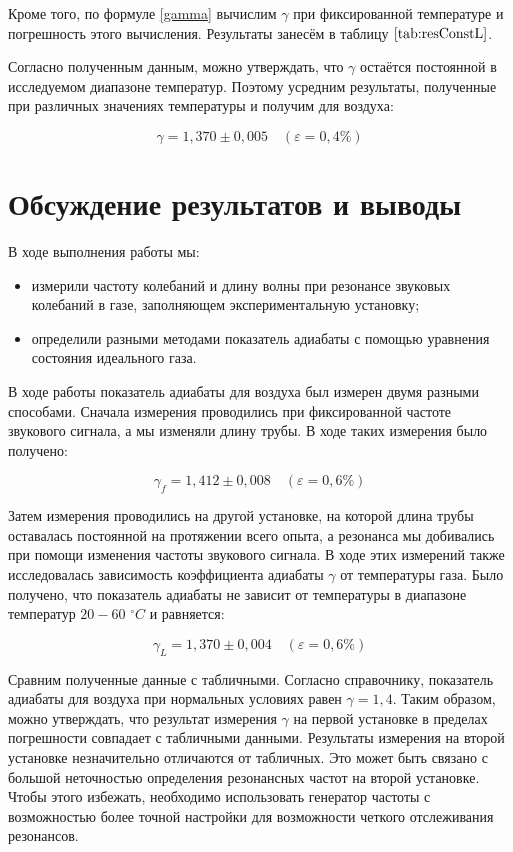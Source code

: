 \documentclass[a4paper,12pt]{article}
\theoremstyle{definition}
\begin{document}
	Кроме того, по формуле \eqref{gamma} вычислим $ \gamma $ при фиксированной температуре и погрешность этого вычисления. Результаты занесём в таблицу $ \ref{tab:resConstL} $. 
	
	Согласно полученным данным, можно утверждать, что $ \gamma $ остаётся постоянной в исследуемом диапазоне температур. Поэтому усредним результаты, полученные при различных значениях температуры и получим для воздуха:
	
	\[ \boxed{\gamma = 1,370 \pm 0,005}\quad (\varepsilon=0,4\%) \]
	
	\section{Обсуждение результатов и выводы}
	
	В ходе выполнения работы мы:
	
	\begin{itemize}
		\item измерили частоту колебаний и длину волны при резонансе звуковых колебаний в газе, заполняющем экспериментальную установку;
		\item определили разными методами показатель адиабаты с помощью уравнения состояния идеального газа.
	\end{itemize}
	
	В ходе работы показатель адиабаты для воздуха был измерен двумя разными способами. Сначала измерения проводились при фиксированной частоте звукового сигнала, а мы изменяли длину трубы. В ходе таких измерения было получено:
	
	\[ \boxed{\gamma_f = 1,412 \pm 0,008}\quad (\varepsilon=0,6\%) \]
	
	Затем измерения проводились на другой установке, на которой длина трубы оставалась постоянной на протяжении всего опыта, а резонанса мы добивались при помощи изменения частоты звукового сигнала. В ходе этих измерений также исследовалась зависимость коэффициента адиабаты $ \gamma $ от температуры газа. Было получено, что показатель адиабаты не зависит от температуры в диапазоне температур $ 20-60 $ $ ^\circ C $ и равняется:
	
	\[ \boxed{\gamma_L = 1,370 \pm 0,004}\quad (\varepsilon=0,6\%) \]
	
	Сравним полученные данные с табличными. Согласно справочнику, показатель адиабаты для воздуха при нормальных условиях равен \underline{$ \gamma = 1,4 $}. Таким образом, можно утверждать, что результат измерения $ \gamma $ на первой установке в пределах погрешности совпадает с табличными данными. Результаты измерения на второй установке незначительно отличаются от табличных. Это может быть связано с большой неточностью определения резонансных частот на второй установке. Чтобы этого избежать, необходимо использовать генератор частоты с возможностью более точной настройки для возможности четкого отслеживания резонансов.
	
\end{document}

